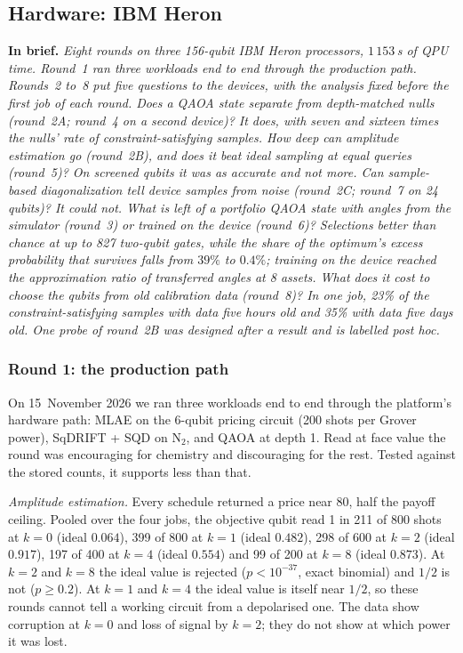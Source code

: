 \documentclass[11pt,a4paper]{article}
\newcommand{\inbrief}[1]{\par\smallskip\noindent\textbf{In brief.} \emph{#1}\par\medskip}
\begin{document}
\subsection{Hardware: IBM Heron}
\label{sec:res-hw}

\inbrief{Eight rounds on three 156-qubit IBM Heron processors, $1\,153$\,s
of QPU time. Round~1 ran three workloads end to end through the production
path. Rounds~2 to~8 put five questions to the devices, with the analysis
fixed before the first job of each round. Does a QAOA state separate from
depth-matched nulls (round~2A; round~4 on a second device)? It does, with
seven and sixteen times the nulls' rate of constraint-satisfying samples.
How deep can amplitude estimation go (round~2B), and does it beat ideal
sampling at equal queries (round~5)? On screened qubits it was as accurate
and not more. Can sample-based diagonalization tell device samples from
noise (round~2C; round~7 on 24 qubits)? It could not. What is left of a
portfolio QAOA state with angles from the simulator (round~3) or trained on
the device (round~6)? Selections better than chance at up to 827 two-qubit
gates, while the share of the optimum's excess probability that survives
falls from $39\%$ to $0.4\%$; training on the device reached the
approximation ratio of transferred angles at 8 assets. What does it cost to
choose the qubits from old calibration data (round~8)? In one job, 23\% of
the constraint-satisfying samples with data five hours old and 35\% with
data five days old. One probe of
round~2B was designed after a result and is labelled post hoc.}

\subsubsection{Round 1: the production path}

On 15~November 2026 we ran three workloads end to end through the platform's
hardware path: MLAE on the 6-qubit pricing circuit (200 shots per Grover
power), SqDRIFT + SQD on N$_2$, and QAOA at depth 1. Read at face value the
round was encouraging for chemistry and discouraging for the rest. Tested
against the stored counts, it supports less than that.

\emph{Amplitude estimation.} Every schedule returned a price near $80$, half
the payoff ceiling. Pooled over the four jobs, the objective qubit read 1 in
211 of 800 shots at $k=0$ (ideal $0.064$), 399 of 800 at $k=1$ (ideal
$0.482$), 298 of 600 at $k=2$ (ideal $0.917$), 197 of 400 at $k=4$ (ideal
$0.554$) and 99 of 200 at $k=8$ (ideal $0.873$). At $k=2$ and $k=8$ the
ideal value is rejected ($p < 10^{-37}$, exact binomial) and $1/2$ is not
($p \ge 0.2$). At $k=1$ and $k=4$ the ideal value is itself near $1/2$, so
these rounds cannot tell a working circuit from a depolarised one. The data
show corruption at $k=0$ and loss of signal by $k=2$; they do not show at
which power it was lost.
\end{document}

